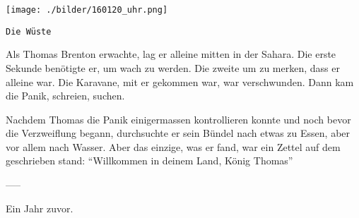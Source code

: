 \thispagestyle{empty}
\begin{center}
\texttt{[image: ./bilder/160120\_uhr.png]}
\end{center}
\vskip 2cm
{\Huge\color{farbe}\hfill{\tt{Die Wüste}}}
\newpage
\lettrine[lines=2, lhang=.2, loversize=.25, lraise=0.05, findent=0.1em,
nindent=0em]{A}{}ls Thomas Brenton erwachte, lag er alleine mitten in der
Sahara. Die erste Sekunde benötigte er, um wach zu werden. Die zweite um zu
merken, dass er alleine war. Die Karavane, mit er gekommen war, war
verschwunden. Dann kam die Panik, schreien, suchen. 

Nachdem Thomas die Panik einigermassen kontrollieren konnte und noch bevor die
Verzweiflung begann, durchsuchte er sein Bündel nach etwas zu Essen, aber vor
allem nach Wasser. Aber das einzige, was er fand, war ein Zettel auf dem
geschrieben stand: \enquote{Willkommen in deinem Land, König Thomas}

-----

Ein Jahr zuvor. 



\vfill
